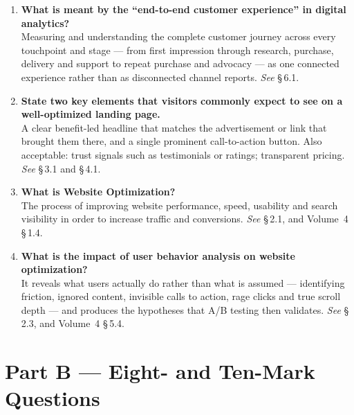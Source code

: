 \begin{enumerate}[leftmargin=2.2em,itemsep=1.1ex]
\item \textbf{What is meant by the ``end-to-end customer experience'' in digital
      analytics?} \\
      Measuring and understanding the complete customer journey across every
      touchpoint and stage --- from first impression through research, purchase,
      delivery and support to repeat purchase and advocacy --- as one connected
      experience rather than as disconnected channel reports.
      \hfill\emph{See} \S\,6.1.

\item \textbf{State two key elements that visitors commonly expect to see on a
      well-optimized landing page.} \\
      A clear benefit-led headline that matches the advertisement or link that
      brought them there, and a single prominent call-to-action button. Also
      acceptable: trust signals such as testimonials or ratings; transparent
      pricing. \hfill\emph{See} \S\,3.1 and \S\,4.1.

\item \textbf{What is Website Optimization?} \\
      The process of improving website performance, speed, usability and search
      visibility in order to increase traffic and conversions.
      \hfill\emph{See} \S\,2.1, and Volume~4 \S\,1.4.

\item \textbf{What is the impact of user behavior analysis on website
      optimization?} \\
      It reveals what users actually do rather than what is assumed ---
      identifying friction, ignored content, invisible calls to action, rage
      clicks and true scroll depth --- and produces the hypotheses that A/B testing
      then validates. \hfill\emph{See} \S\,2.3, and Volume~4 \S\,5.4.

\end{enumerate}

\section*{Part B --- Eight- and Ten-Mark Questions}

